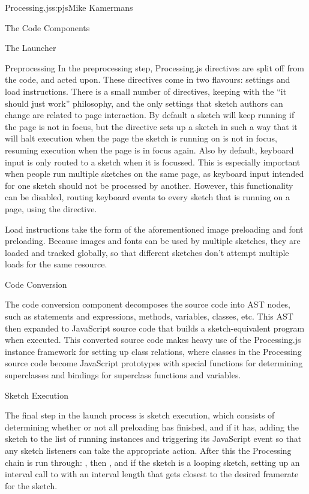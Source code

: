 \begin{aosachapter}{Processing.js}{s:pjs}{Mike Kamermans}
\begin{aosasect1}{The Code Components}
\begin{aosasect2}{The Launcher}
\begin{aosasect3}{Preprocessing}
In the preprocessing step, Processing.js directives are split off from
the code, and acted upon. These directives come in two flavours:
settings and load instructions. There is a small number of directives,
keeping with the ``it should just work'' philosophy, and the only
settings that sketch authors can change are related to page
interaction. By default a sketch will keep running if the page is not
in focus, but the  directive sets up a sketch in
such a way that it will halt execution when the page the sketch is
running on is not in focus, resuming execution when the page is in
focus again. Also by default, keyboard input is only routed to a
sketch when it is focussed. This is especially important when people
run multiple sketches on the same page, as keyboard input intended for
one sketch should not be processed by another. However, this
functionality can be disabled, routing keyboard events to every sketch
that is running on a page, using the  directive.

Load instructions take the form of the aforementioned image preloading
and font preloading. Because images and fonts can be used by multiple
sketches, they are loaded and tracked globally, so that different
sketches don't attempt multiple loads for the same resource.

\end{aosasect3}

\begin{aosasect3}{Code Conversion}

The code conversion component decomposes the source code into AST
nodes, such as statements and expressions, methods, variables,
classes, etc. This AST then expanded to JavaScript source code that
builds a sketch-equivalent program when executed. This converted
source code makes heavy use of the Processing.js instance framework
for setting up class relations, where classes in the Processing source
code become JavaScript prototypes with special functions for
determining superclasses and bindings for superclass functions and
variables.

\end{aosasect3}

\begin{aosasect3}{Sketch Execution}

The final step in the launch process is sketch execution, which
consists of determining whether or not all preloading has finished,
and if it has, adding the sketch to the list of running instances
and triggering its JavaScript  event so that any sketch
listeners can take the appropriate action. After this the Processing
chain is run through: , then , and if the
sketch is a looping sketch, setting up an interval call to 
with an interval length that gets closest to the desired framerate for
the sketch.


\end{aosasect3}
\end{aosasect2}
\end{aosasect1}
\end{aosachapter}
